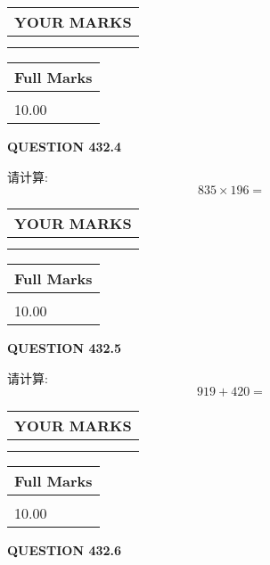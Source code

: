 \documentclass{ctexart}
\begin{document}
\noindent\begin{tabular}{|l|}
\hline
 YOUR MARKS  \\
\hline
 \\ 
 \\ 
\hline
\end{tabular}
\hspace{0.05in} \begin{tabular}{|l|}
\hline
 Full Marks  \\
\hline
 \\ 
10.00 \\
\hline
\end{tabular}
{\textbf{\Large{QUESTION
432.4 
}}}
  
  
 
请计算:
\begin{equation}
835  \times    %
196 = \nonumber
\end{equation}
 

 

 
  
\vspace{0.2in}
  
\noindent\begin{tabular}{|l|}
\hline
 YOUR MARKS  \\
\hline
 \\ 
 \\ 
\hline
\end{tabular}
\hspace{0.05in} \begin{tabular}{|l|}
\hline
 Full Marks  \\
\hline
 \\ 
10.00 \\
\hline
\end{tabular}
{\textbf{\Large{QUESTION
432.5 
}}}
  
  
 
请计算:
\begin{equation}
919 +  %
420 = \nonumber
\end{equation}
 

 

 
  
\vspace{0.2in}
  
\noindent\begin{tabular}{|l|}
\hline
 YOUR MARKS  \\
\hline
 \\ 
 \\ 
\hline
\end{tabular}
\hspace{0.05in} \begin{tabular}{|l|}
\hline
 Full Marks  \\
\hline
 \\ 
10.00 \\
\hline
\end{tabular}
{\textbf{\Large{QUESTION
432.6 
}}}
  
\end{document}
